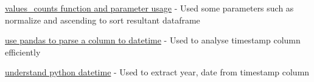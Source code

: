 \documentclass[12pt,a4paper,final]{article}
\begin{document}
\noindent
\href{https://www.w3resource.com/pandas/series/series-value_counts.php}{values_counts function and parameter usage}
\newline - Used some parameters such as normalize and ascending to sort resultant dataframe

\href{https://pandas.pydata.org/pandas-docs/stable/reference/api/pandas.to_datetime.html}{use pandas to parse a column to datetime}
\newline - Used to analyse timestamp column efficiently

\href{https://docs.python.org/3/library/datetime.html} {understand python datetime}
\newline - Used to extract year, date from timestamp column
\end{document}
